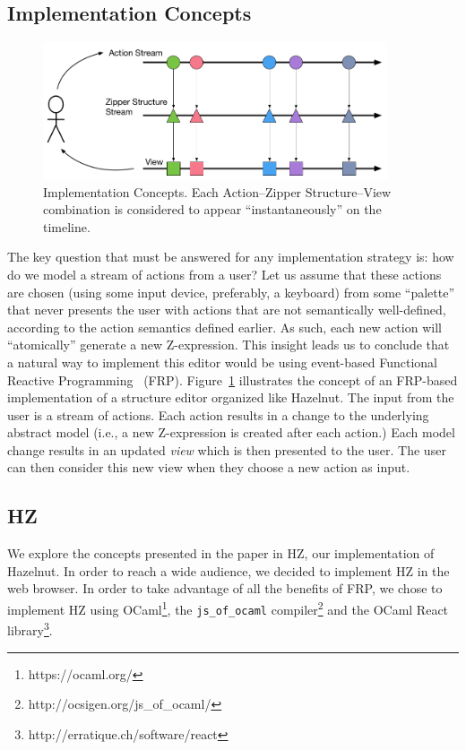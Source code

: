 \subsection{Implementation Concepts}

\begin{figure}
\centering
\includegraphics[width=4in]{Implementation_Diagram}
\caption{Implementation Concepts. Each Action--Zipper Structure--View combination is considered to appear ``instantaneously'' on the timeline.}
\label{fig:FRP}
\end{figure}

The key question that must be answered for any implementation strategy is: how do we model a stream of actions from a user? Let us assume that these actions are chosen (using some input device, preferably, a keyboard) from some ``palette'' that never presents the user with actions that are not semantically well-defined, according to the action semantics defined earlier.
As such, each new action will ``atomically'' generate a new Z-expression. 
This insight leads us to conclude that a natural way to implement this editor would be using event-based Functional Reactive Programming~\cite{Wan:2000:FRP:349299.349331} (FRP).
Figure~\ref{fig:FRP} illustrates the concept of an FRP-based implementation of a  structure editor organized like Hazelnut.
The input from the user is a stream of actions.  Each action results in a change to the underlying abstract model (i.e., a new Z-expression is created after each action.)
Each model change results in an updated \emph{view} which is then presented to the user.  The user can then consider this new view when they choose a new action as input.

\subsection{HZ}
We explore the concepts presented in the paper in HZ, our implementation of Hazelnut.
In order to reach a wide audience, we decided to implement HZ in the web browser.
In order to take advantage of all the benefits of FRP, we chose to implement HZ using OCaml\footnote{https://ocaml.org/}, the \texttt{js\_of\_ocaml} compiler\footnote{http://ocsigen.org/js\_of\_ocaml/} and the OCaml React library\footnote{http://erratique.ch/software/react}.

